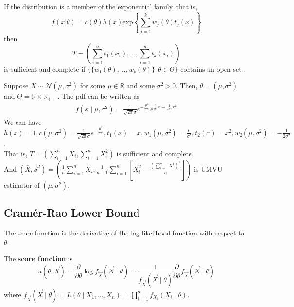 \documentclass[11pt]{elegantbook}
\begin{document}
\begin{theorem}\label{comp_exp_fam}
    If the distribution is a member of the exponential family, that is, $$f(x|\theta)=c(\theta)h(x)\text{exp}\left\{\sum_{j=1}^k w_j(\theta) t_j(x)\right\}$$ then $$T=\left(\sum_{i=1}^n t_1(x_i),...,\sum_{i=1}^n t_k(x_i)\right)$$ is sufficient and complete if $\{\{w_1(\theta),...,w_k(\theta)\}:\theta\in\Theta\}$ contains an open set.
\end{theorem}
\begin{example}
    Suppose $X\sim \mathcal{N}(\mu,\sigma^2)$ for some $\mu\in \mathbb{R}$ and some $\sigma^2>0$. Then, $\theta=(\mu,\sigma^2)$ and $\Theta=\mathbb{R}\times \mathbb{R}_{++}$. The pdf can be written as
    \begin{equation}
        \begin{aligned}
            f(x\mid \mu,\sigma^2)=\frac{1}{\sqrt{2\pi}\sigma}e^{-\frac{\mu^2}{2\sigma^2}}e^{\frac{\mu}{\sigma^2}x-\frac{1}{2\sigma^2}x^2}
        \end{aligned}
        \nonumber
    \end{equation}
    We can have $h(x)=1, c(\mu,\sigma^2)=\frac{1}{\sqrt{2\pi}\sigma}e^{-\frac{\mu^2}{2\sigma^2}}, t_1(x)=x, w_1(\mu,\sigma^2)=\frac{\mu}{\sigma^2}, t_2(x)=x^2, w_2(\mu,\sigma^2)=-\frac{1}{2\sigma^2}$.\\
    That is, $T=\left(\sum_{i=1}^n X_i, \sum_{i=1}^n X_i^2\right)$ is sufficient and complete.\\
    And $\left(\bar{X},S^2\right)=\left(\frac{1}{n}\sum_{i=1}^n X_i,\frac{1}{n-1}\sum_{i=1}^n\left[X_i^2-\frac{(\sum_{i=1}^n X_i^2)^2}{n}\right]\right)$ is UMVU estimator of $(\mu,\sigma^2)$.
\end{example}


\subsection{Cramér-Rao Lower Bound}
The score function is the derivative of the log likelihood function with respect to $\theta$.
\begin{definition}
    \normalfont
    The \textbf{score function} is $$u(\theta,\vec{X})=\frac{\partial}{\partial \theta}\log f_{\vec{X}}(\vec{X}\mid\theta)=\frac{1}{f_{\vec{X}}(\vec{X}\mid\theta)}\frac{\partial}{\partial \theta}f_{\vec{X}}(\vec{X}\mid\theta)$$
    where $f_{\vec{X}}(\vec{X}\mid\theta)=L(\theta\mid X_1,...,X_n)=\prod_{i=1}^n f_{X_i}(X_i\mid\theta)$.
\end{definition}
\end{document}
